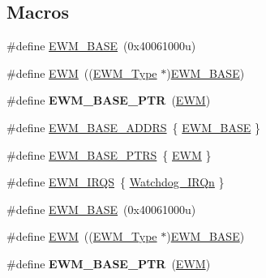 \subsection*{Macros}
\begin{DoxyCompactItemize}
\item 
\#define \hyperlink{group__EWM__Peripheral__Access__Layer_ga8609fc69000c45828e80571006c9c5c2}{E\+W\+M\+\_\+\+B\+A\+SE}~(0x40061000u)
\item 
\#define \hyperlink{group__EWM__Peripheral__Access__Layer_ga4c690a7633d3de9e8469adc23f784085}{E\+WM}~((\hyperlink{structEWM__Type}{E\+W\+M\+\_\+\+Type} $\ast$)\hyperlink{group__EWM__Peripheral__Access__Layer_ga8609fc69000c45828e80571006c9c5c2}{E\+W\+M\+\_\+\+B\+A\+SE})
\item 
\#define {\bfseries E\+W\+M\+\_\+\+B\+A\+S\+E\+\_\+\+P\+TR}~(\hyperlink{group__EWM__Peripheral__Access__Layer_ga4c690a7633d3de9e8469adc23f784085}{E\+WM})\hypertarget{group__EWM__Peripheral__Access__Layer_gae3454b5b37183b746362498d1fafc40c}{}\label{group__EWM__Peripheral__Access__Layer_gae3454b5b37183b746362498d1fafc40c}

\item 
\#define \hyperlink{group__EWM__Peripheral__Access__Layer_ga1c3d806fd3948bbda5da2601cda208b4}{E\+W\+M\+\_\+\+B\+A\+S\+E\+\_\+\+A\+D\+D\+RS}~\{ \hyperlink{group__EWM__Peripheral__Access__Layer_ga8609fc69000c45828e80571006c9c5c2}{E\+W\+M\+\_\+\+B\+A\+SE} \}
\item 
\#define \hyperlink{group__EWM__Peripheral__Access__Layer_ga8b79ee9e363583bee6122ee3da7952b2}{E\+W\+M\+\_\+\+B\+A\+S\+E\+\_\+\+P\+T\+RS}~\{ \hyperlink{group__EWM__Peripheral__Access__Layer_ga4c690a7633d3de9e8469adc23f784085}{E\+WM} \}
\item 
\#define \hyperlink{group__EWM__Peripheral__Access__Layer_gac4f8bfcf7bfc6874ed0b321c67dd3111}{E\+W\+M\+\_\+\+I\+R\+QS}~\{ \hyperlink{group__Interrupt__vector__numbers_gga666eb0caeb12ec0e281415592ae89083a3f04766f3177f0152623a86e39ccef06}{Watchdog\+\_\+\+I\+R\+Qn} \}
\item 
\#define \hyperlink{group__EWM__Peripheral__Access__Layer_ga8609fc69000c45828e80571006c9c5c2}{E\+W\+M\+\_\+\+B\+A\+SE}~(0x40061000u)
\item 
\#define \hyperlink{group__EWM__Peripheral__Access__Layer_ga4c690a7633d3de9e8469adc23f784085}{E\+WM}~((\hyperlink{structEWM__Type}{E\+W\+M\+\_\+\+Type} $\ast$)\hyperlink{group__EWM__Peripheral__Access__Layer_ga8609fc69000c45828e80571006c9c5c2}{E\+W\+M\+\_\+\+B\+A\+SE})
\item 
\#define {\bfseries E\+W\+M\+\_\+\+B\+A\+S\+E\+\_\+\+P\+TR}~(\hyperlink{group__EWM__Peripheral__Access__Layer_ga4c690a7633d3de9e8469adc23f784085}{E\+WM})\hypertarget{group__EWM__Peripheral__Access__Layer_gae3454b5b37183b746362498d1fafc40c}{}\label{group__EWM__Peripheral__Access__Layer_gae3454b5b37183b746362498d1fafc40c}


\end{DoxyCompactItemize}
